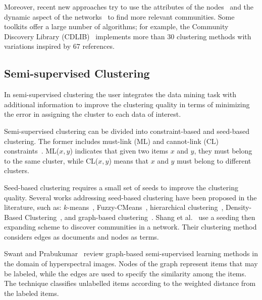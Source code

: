 Moreover, recent new approaches try to use the attributes of the nodes~\cite{yang2013community} and the dynamic aspect of the networks~\cite{rossetiSurvey} to find more relevant communities. Some toolkits offer a large number of algorithms; for example, the Community Discovery Library (CDLIB)~\cite{rossettiCDLIBPythonLibrary2019} implements more than 30 clustering methods with variations inspired by 67 references.



\subsection{Semi-supervised Clustering}\label{sec:semisupervised}

In semi-supervised clustering the user integrates the data mining task with additional information to improve the clustering quality in terms of minimizing the error in assigning the cluster to each data of interest.

Semi-supervised clustering can be divided into constraint-based and seed-based clustering.
The former includes must-link (ML) and cannot-link (CL) constraints~\cite{basu08, wagstaff2001constrained}. ML($x,y$) indicates that given two items $x$ and $y$, they must belong to the same cluster, while CL($x,y$) means that $x$ and $y$ must belong to different clusters.

Seed-based clustering requires a small set of seeds to improve the clustering quality. Several works addressing seed-based clustering have been proposed in the literature, such as: $k$-means~\cite{basu02}, Fuzzy-CMeans~\cite{bensaid96}, hierarchical clustering~\cite{bohm08}, Density-Based Clustering~\cite{lelis09}, and graph-based clustering~\cite{wagstaff2001constrained}.
Shang et al.~\cite{shang2017efficiently} use a seeding then expanding scheme to discover communities in a network. Their clustering method considers edges as documents and nodes as terms.

Swant and Prabukumar~\cite{SAWANT2018} review graph-based semi-supervised learning methods in the domain of hyperspectral images.
Nodes of the graph represent items that may be labeled, while the edges are used to specify the similarity among the items.
The technique classifies unlabelled items according to the weighted distance from the labeled items.

